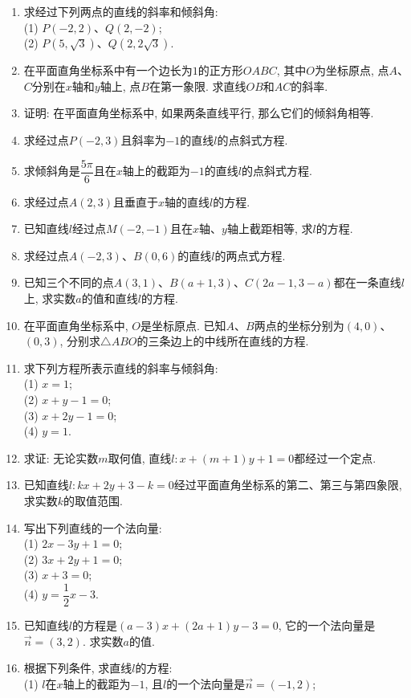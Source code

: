 \documentclass[10pt,a4paper]{article}
\begin{document}
\begin{enumerate}[1.]
\item 求经过下列两点的直线的斜率和倾斜角:\\
(1) $P(-2, 2)$、$Q(2, -2)$;\\
(2) $P(5,\sqrt 3)$、$Q(2,2\sqrt 3)$.
\item 在平面直角坐标系中有一个边长为$1$的正方形$OABC$, 其中$O$为坐标原点, 点$A$、$C$分别在$x$轴和$y$轴上, 点$B$在第一象限. 求直线$OB$和$AC$的斜率.
\item 证明: 在平面直角坐标系中, 如果两条直线平行, 那么它们的倾斜角相等.
\item 求经过点$P(-2,3)$且斜率为$-1$的直线$l$的点斜式方程.
\item 求倾斜角是$\dfrac{5\pi} 6$且在$x$轴上的截距为$-1$的直线$l$的点斜式方程.
\item 求经过点$A(2,3)$且垂直于$x$轴的直线$l$的方程.
\item 已知直线$l$经过点$M(-2,-1)$且在$x$轴、$y$轴上截距相等, 求$l$的方程. 
\item 求经过点$A(-2,3)$、$B(0,6)$的直线$l$的两点式方程.
\item 已知三个不同的点$A(3,1)$、$B(a+1,3)$、$C(2a-1,3-a)$都在一条直线$l$上, 求实数$a$的值和直线$l$的方程.
\item 在平面直角坐标系中, $O$是坐标原点. 已知$A$、$B$两点的坐标分别为$(4,0)$、$
(0,3)$, 分别求$\triangle ABO$的三条边上的中线所在直线的方程. 
\item 求下列方程所表示直线的斜率与倾斜角:\\
(1) $x=1$;\\
(2) $x+y-1=0$;\\
(3) $x+2y-1=0$;\\
(4) $y=1$.
\item 求证: 无论实数$m$取何值, 直线$l:x+(m+1)y+1=0$都经过一个定点.
\item 已知直线$l:kx+2y+3-k=0$经过平面直角坐标系的第二、第三与第四象限, 求实数$k$的取值范围.
\item 写出下列直线的一个法向量:\\
(1) $2x-3y+1=0$;\\
(2) $3x+2y+1=0$;\\
(3) $x+3=0$;\\
(4) $y=\dfrac 12x-3$.
\item 已知直线$l$的方程是$(a-3)x+(2a+1)y-3=0$, 它的一个法向量是$\overrightarrow n=(3,2)$. 求实数$a$的值.
\item 根据下列条件, 求直线$l$的方程:\\
(1) $l$在$x$轴上的截距为$-1$, 且$l$的一个法向量是$\overrightarrow n=(-1,2)$;\\

\end{enumerate}
\end{document}
